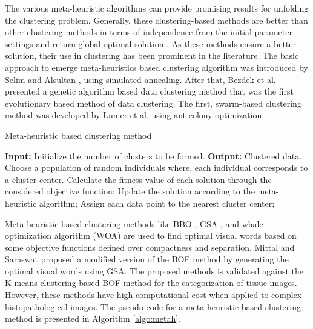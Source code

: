 \begin{itemize}
The various meta-heuristic algorithms can provide promising results for unfolding the   clustering problem. Generally, these clustering-based methods are better than other clustering methods in terms of independence from the initial parameter settings and return global optimal solution \cite{jose2016automatic}. As these methods ensure a better solution, their use in clustering has been prominent in the literature. The basic approach to emerge meta-heuristics based clustering algorithm was introduced by Selim and Alsultan \cite{selim1991simulated}, using simulated annealing. After that, Bezdek et al. \cite{bezdek1994genetic} presented a genetic algorithm based data clustering method that was the first evolutionary based method of data clustering.  The first, swarm-based clustering method was developed by Lumer et al. \cite{langham1999using} using ant colony optimization.  
\begin{algorithm}[h!]
\caption{Meta-heuristic based clustering method}
\label{algo:metah}
{\footnotesize
\begin{algorithmic}
\STATE\textbf{Input:} Initialize the number of clusters to be formed.
\STATE\textbf{Output:} Clustered data.
\STATE Choose a population of random individuals where, each individual corresponds to a cluster center.
\STATE Calculate the fitness value of each solution through the considered objective function;
\STATE Update the solution according to the meta-heuristic algorithm;
\STATE Assign each data point to the nearest cluster center;
\ENDWHILE
\end{algorithmic}
}
\end{algorithm}

Meta-heuristic based clustering methods like BBO \cite{Pal2018}, GSA \cite{Mittal2019}, and whale optimization algorithm (WOA) \cite{Tiwari2019} are used to find optimal visual words based on some objective functions defined over compactness and separation. Mittal and Saraswat  \cite{Mittal2019} proposed a modified version of the  BOF method by generating the optimal visual words using GSA. The proposed methods is validated against the K-means clustering based BOF method for the categorization of tissue images. However, these methods  have high computational cost when applied to complex histopathological images. The pseudo-code for a meta-heuristic based clustering method is presented in Algorithm \ref{algo:metah}.
\end{itemize}

